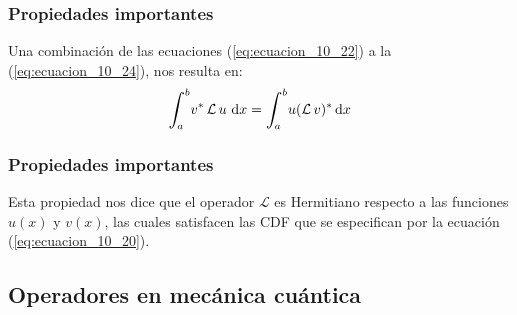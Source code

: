 \documentclass[12pt]{beamer}
\begin{document}
\begin{frame}
\frametitle{Propiedades importantes}
Una combinación de las ecuaciones (\ref{eq:ecuacion_10_22}) a la (\ref{eq:ecuacion_10_24}), nos resulta en:
\pause
\begin{align}
\scaleint{6ex}_{\bs a}^{b} v^{*} \, \mathcal{L} \, u \, \dd{x} = \scaleint{6ex}_{\bs a}^{b} u (\mathcal{L}  \, v)^{*} \dd{x}
\label{eq:ecuacion_10_25}
\end{align}
\end{frame}
\begin{frame}
\frametitle{Propiedades importantes}
Esta propiedad nos dice que el operador $\mathcal{L}$ es Hermitiano respecto a las funciones $u(x)$ y $v(x)$, las cuales satisfacen las CDF que se especifican por la ecuación (\ref{eq:ecuacion_10_20}).
\end{frame}

\subsection{Operadores en mecánica cuántica}
\end{document}
